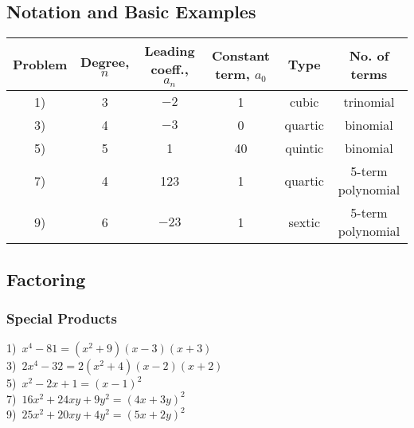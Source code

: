\documentclass[11pt]{book}
\newcommand{\tmstrong}[1]{\textbf{#1}}
\theoremstyle{definition}  %
\newcommand{\pp}{\par~\par}
\begin{document}
\subsection*{Notation and Basic Examples}
 

 \begin{tabular}{c|ccccc}
	Problem & Degree, $n$ & Leading coeff., $a_n$ & Constant term, $a_0$ & Type & No. of terms\\
	\hline
	1) & 3 & $-2$ & 1 & cubic & trinomial\\
	3) & 4 & $-3$ & 0 & quartic & binomial\\
	5) & 5 & 1 & 40 & quintic & binomial\\
	7) & 4 & 123 & 1 & quartic & 5-term polynomial\\
	9) & 6 & $-23$ & 1 & sextic & 5-term polynomial\\
\end{tabular}

\subsection*{Factoring}
\subsubsection{Special Products} 


  1)~$x^4-81=(x^2+9)(x-3)(x+3)$\\
  3)~$2x^4-32=2(x^2+4)(x-2)(x+2)$\\
  5)~$x^2-2x+1=(x-1)^2$\\
  7)~$16 x^2 + 24 x y + 9 y^2=(4x+3y)^2$\\
  9)~$25 x^2 + 20 x y + 4 y^2=(5x+2y)^2$
\end{document}
